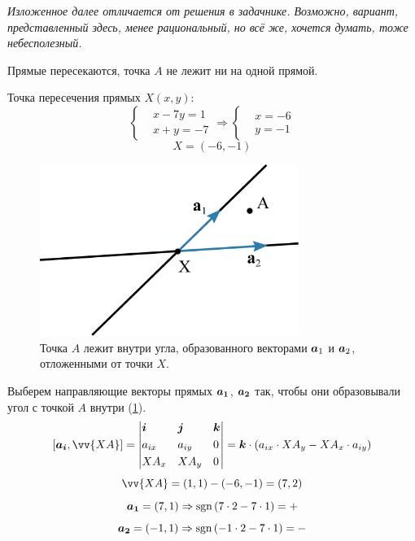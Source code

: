 \documentclass[a4paper,12pt]{article}
\begin{document}
  \begin{solution}
    \emph{Изложенное далее отличается от решения в задачнике.
    Возможно, вариант, представленный здесь, менее рациональный, но всё же, хочется думать, тоже небесполезный.}
    
    Прямые пересекаются, точка $A$ не лежит ни на одной прямой.
      
    Точка пересечения прямых $X(x, y)$:
    \[
      \left\{\begin{aligned}
        &x - 7y = 1\\
        &x + y = -7
      \end{aligned}\right.
      \Rightarrow
      \left\{\begin{aligned}
        &x = -6\\
        &y = -1
      \end{aligned}\right.
    \]
    \[
      \boxed{X = (-6, -1)}
    \]
    
    \begin{figure}[h]
      \centering
      
      \includegraphics[width=0.75\textwidth]{5-53}
      
      \caption{Точка $A$ лежит внутри угла, образованного векторами $\boldsymbol a_1$ и $\boldsymbol a_2$, отложенными от точки $X$.}
      \label{fig:5-53}
    \end{figure}

    Выберем направляющие векторы прямых $\boldsymbol{a_1}$, $\boldsymbol{a_2}$ так, чтобы они образовывали угол с точкой $A$ внутри (\ref{fig:5-53}).
    \[
      [\bds{a_i}, \vv{XA}] = \left|
        \begin{aligned}
          &\bds i & &\bds j & &\bds k\\
          &a_{ix} & &a_{iy} & &0\\
          &XA_x & &XA_y & &0
        \end{aligned}
      \right|
      = \bds k \cdot (a_{ix} \cdot XA_y - XA_x \cdot a_{iy})
    \]
    \[
      \vv{XA} = (1, 1) - (-6, -1) = (7, 2)
    \]
    \[
      \boldsymbol{a_1} = (7, 1) \Rightarrow \operatorname{sgn}{(7 \cdot 2 - 7 \cdot 1)} = +
    \]
    \[
      \boldsymbol{a_2} = (-1, 1) \Rightarrow \operatorname{sgn}{(-1 \cdot 2 - 7 \cdot 1)} = -
    \]
    

\end{solution}
\end{document}
